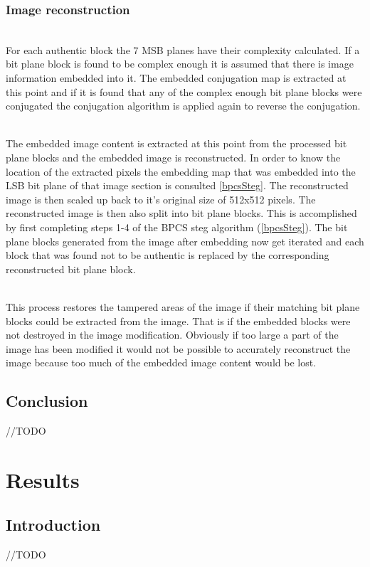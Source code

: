 \documentclass[12pt]{article}
\begin{document}
\subsubsection{Image reconstruction}
\hspace{0pt} \\
For each authentic block the 7 MSB planes have their complexity calculated.
If a bit plane block is found to be complex enough it is assumed that there is image information embedded into it.
The embedded conjugation map is extracted at this point and if it is found that any of the complex enough bit plane blocks were conjugated the conjugation algorithm is applied again to reverse the conjugation.

\hspace{0pt} \\
The embedded image content is extracted at this point from the processed bit plane blocks and the embedded image is reconstructed.
In order to know the location of the extracted pixels the embedding map that was embedded into the LSB bit plane of that image section is consulted \ref{bpcsSteg}.
The reconstructed image is then scaled up back to it's original size of 512x512 pixels.
The reconstructed image is then also split into bit plane blocks.
This is accomplished by first completing steps 1-4 of the BPCS steg algorithm (\ref{bpcsSteg}).
The bit plane blocks generated from the image after embedding now get iterated and each block that was found not to be authentic is replaced by the corresponding reconstructed bit plane block. 

\hspace{0pt} \\
This process restores the tampered areas of the image if their matching bit plane blocks could be extracted from the image. That is if the embedded blocks were not destroyed in the image modification. 
Obviously if too large a part of the image has been modified it would not be possible to accurately reconstruct the image because too much of the embedded image content would be lost.

\subsection{Conclusion}
//TODO 


\section{Results} 
\subsection{Introduction}
//TODO
\end{document}
